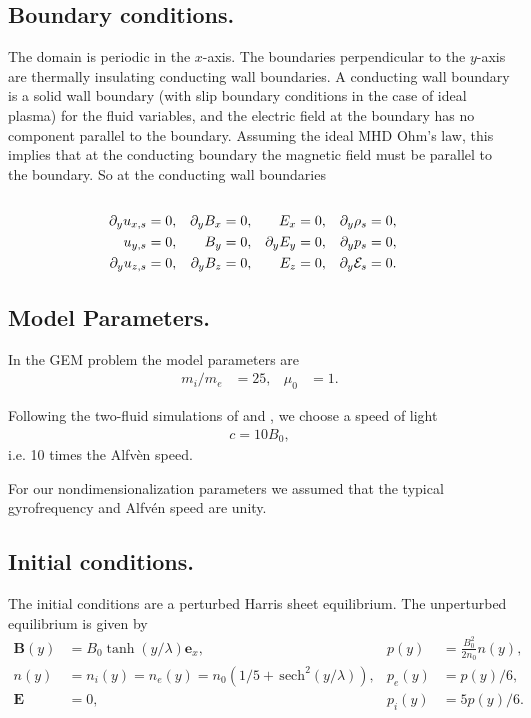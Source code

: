 \documentclass[12pt,fleqn]{article}
\numberwithin{equation}{section}
\begin{document}
\subsection{Boundary conditions.}
The domain is periodic in the $x$-axis.
The boundaries perpendicular to the $y$-axis
are thermally insulating conducting wall boundaries.  
A conducting wall boundary is a solid wall boundary
(with slip boundary conditions in the case of ideal plasma)
for the fluid variables, and the electric field at
the boundary has no component parallel to the boundary.
Assuming the ideal MHD Ohm's law, this implies that
at the conducting boundary the magnetic field must be parallel to 
the boundary.  So at the conducting wall boundaries
\begin{align*}
 \\ \partial_y u_{x,s} &= 0,
 &  \partial_y B_x &= 0,
 &  E_x &= 0,
 & \partial_y \rho_s &= 0,
 \\ u_{y,s} &= 0,
 &  B_y &= 0,
 &  \partial_y E_y &= 0,
 & \partial_y p_s &= 0,
 \\ \partial_y u_{z,s} &= 0,
 &  \partial_y B_z &= 0,
 &  E_z &= 0,
 & \partial_y \mathcal{E}_s &= 0.
\end{align*}

\subsection{Model Parameters.}
In the GEM problem the model parameters are
\begin{align*}
   m_i/m_e &= 25,
 & \mu_0 &= 1.
\end{align*}

Following the two-fluid simulations of
\cite{article:Loverich05} and \cite{article:Hakim06},
we choose a speed of light
\begin{align*}
  c = 10 B_0,
\end{align*}
i.e. 10 times the Alfv\`en speed.

For our nondimensionalization parameters we assumed that
the typical gyrofrequency and Alfv\'en speed are unity.

\subsection{Initial conditions.}
The initial conditions are a perturbed Harris sheet equilibrium.
The unperturbed equilibrium is given by
\def\e{\mathbf{e}}
\def\B{\mathbf{B}}
\def\E{\mathbf{E}}
\def\J{\mathbf{J}}
\def\sech{\,\mathrm{sech}}
\begin{align*}
    \B(y) & =B_0\tanh(y/\lambda)\e_x,
  & p(y) &= \frac{B_0^2}{2 n_0} n(y),
 \\ n(y) &= n_i(y) = n_e(y)
            = n_0(1/5+\sech^2(y/\lambda)),
  & p_e(y) &= p(y)/6,
 \\ \E & =0,
  & p_i(y) &= 5p(y)/6.
\end{align*}
\end{document}
